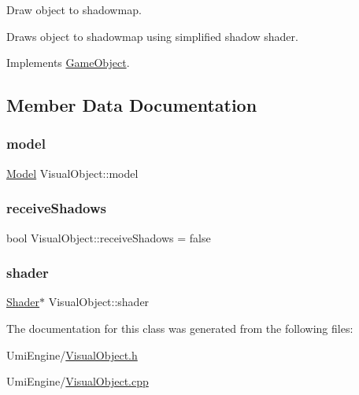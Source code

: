 Draw object to shadowmap. 

Draws object to shadowmap using simplified shadow shader. 

Implements \mbox{\hyperlink{class_game_object_a78bf45c8ef3805247435583556087788}{Game\+Object}}.



\subsection{Member Data Documentation}
\mbox{\label{class_visual_object_a325fec77ff1a5441f1ff4ffa98e508c8}} 
\subsubsection{\texorpdfstring{model}{model}}
{\footnotesize\ttfamily \mbox{\hyperlink{class_model}{Model}} Visual\+Object\+::model}

\mbox{\label{class_visual_object_af54b3c823b3ca24736faeedc88ef90f3}} 
\subsubsection{\texorpdfstring{receiveShadows}{receiveShadows}}
{\footnotesize\ttfamily bool Visual\+Object\+::receive\+Shadows = false}

\mbox{\label{class_visual_object_a6d00e06796983b19f57d6fd86b202902}} 
\subsubsection{\texorpdfstring{shader}{shader}}
{\footnotesize\ttfamily \mbox{\hyperlink{class_shader}{Shader}}$\ast$ Visual\+Object\+::shader}



The documentation for this class was generated from the following files\+:\begin{DoxyCompactItemize}
\item 
Umi\+Engine/\mbox{\hyperlink{_visual_object_8h}{Visual\+Object.\+h}}\item 
Umi\+Engine/\mbox{\hyperlink{_visual_object_8cpp}{Visual\+Object.\+cpp}}\end{DoxyCompactItemize}

